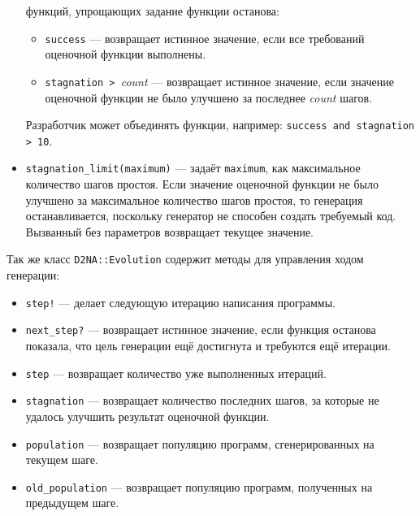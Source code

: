 \documentclass[utf8,a5paper,portrait,10pt]{eskdtext}
\begin{document}
\begin{itemize}
        функций, упрощающих задание функции останова:
        \begin{itemize}
          \item \texttt{success} — возвращает истинное значение, если все
                требований оценочной функции выполнены.
          \item \texttt{stagnation > }\textit{count} — возвращает истинное
                значение, если значение оценочной функции не было улучшено за
                последнее \textit{count} шагов.
        \end{itemize}
        Разработчик может объединять функции, например:
        \texttt{success and stagnation > 10}.
  \item \texttt{stagnation\_limit(maximum)} — задаёт \texttt{maximum}, как
        максимальное количество шагов простоя. Если значение оценочной функции
        не было улучшено за максимальное количество шагов простоя, то генерация
        останавливается, поскольку генератор не способен создать требуемый код.
        Вызванный без параметров возвращает текущее значение.
\end{itemize}

\newpage
Так же класс \texttt{D2NA::Evolution} содержит методы для управления ходом
генерации:
\begin{itemize}
  \item \texttt{step!} — делает следующую итерацию написания программы.
  \item \texttt{next\_step?} — возвращает истинное значение, если функция
        останова показала, что цель генерации ещё достигнута и требуются ещё
        итерации.
  \item \texttt{step} — возвращает количество уже выполненных итераций.
  \item \texttt{stagnation} — возвращает количество последних шагов, за которые
        не удалось улучшить результат оценочной функции.
  \item \texttt{population} — возвращает популяцию программ, сгенерированных на
        текущем шаге.
  \item \texttt{old\_population} — возвращает популяцию программ, полученных на
        предыдущем шаге.
\end{itemize}
\end{document}
